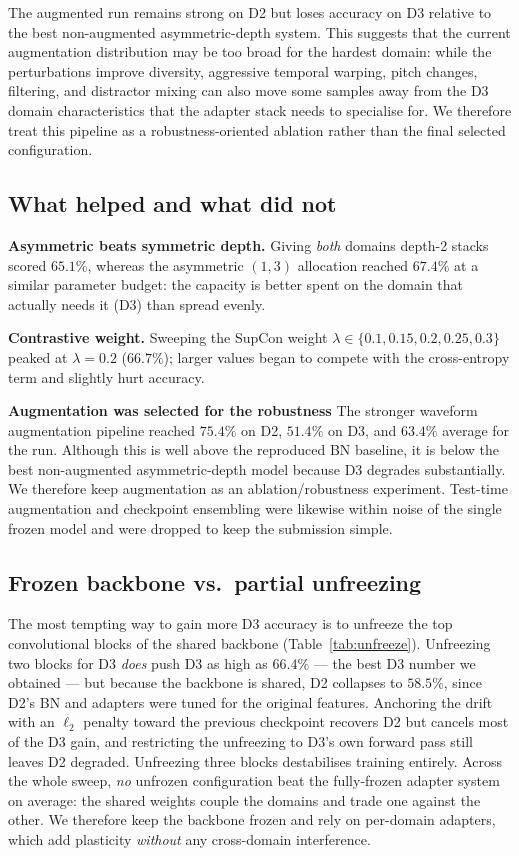 \documentclass{article}
\begin{document}
\begin{sloppy}
The augmented run remains strong on D2 but loses accuracy on D3 relative to the
best non-augmented asymmetric-depth system.  This suggests that the current
augmentation distribution may be too broad for the hardest domain: while the
perturbations improve diversity, aggressive temporal warping, pitch changes,
filtering, and distractor mixing can also move some samples away from the D3
domain characteristics that the adapter stack needs to specialise for.  We
therefore treat this pipeline as a robustness-oriented ablation rather than the
final selected configuration.


\subsection{What helped and what did not}
\label{ssec:choices}

\noindent\textbf{Asymmetric beats symmetric depth.} Giving \emph{both} domains
depth-2 stacks scored $65.1\%$, whereas the asymmetric $(1,3)$ allocation
reached $67.4\%$ at a similar parameter budget: the capacity is better spent
on the domain that actually needs it (D3) than spread evenly.

\noindent\textbf{Contrastive weight.} Sweeping the SupCon weight $\lambda \in
\{0.1,0.15,0.2,0.25,0.3\}$ peaked at $\lambda=0.2$ ($66.7\%$); larger values
began to compete with the cross-entropy term and slightly hurt accuracy.

\noindent\textbf{Augmentation was selected for the robustness} The stronger
waveform augmentation pipeline reached $75.4\%$ on D2, $51.4\%$ on D3, and
$63.4\%$ average for the run.  Although
this is well above the reproduced BN baseline, it is below the best
non-augmented asymmetric-depth model because D3 degrades substantially.  We
therefore keep augmentation as an ablation/robustness experiment. Test-time
augmentation and checkpoint ensembling were likewise within noise of the single
frozen model and were dropped to keep the submission simple.

\subsection{Frozen backbone vs.\ partial unfreezing}
\label{ssec:discussion}

The most tempting way to gain more D3 accuracy is to unfreeze the top
convolutional blocks of the shared backbone (Table~\ref{tab:unfreeze}).
Unfreezing two blocks for D3 \emph{does} push D3 as high as $66.4\%$ --- the
best D3 number we obtained --- but because the backbone is shared, D2
collapses to $58.5\%$, since D2's BN and adapters were tuned for the original
features. Anchoring the drift with an $\ell_2$ penalty toward the previous
checkpoint recovers D2 but cancels most of the D3 gain, and restricting the
unfreezing to D3's own forward pass still leaves D2 degraded. Unfreezing three
blocks destabilises training entirely. Across the whole sweep, \emph{no}
unfrozen configuration beat the fully-frozen adapter system on average: the
shared weights couple the domains and trade one against the other. We
therefore keep the backbone frozen and rely on per-domain adapters, which add
plasticity \emph{without} any cross-domain interference.


\end{sloppy}
\end{document}
